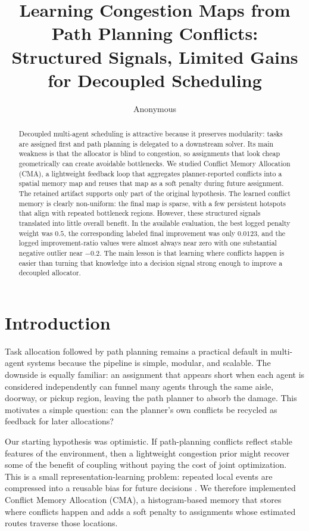 \documentclass{article} %
\title{
Learning Congestion Maps from Path Planning Conflicts:\\
Structured Signals, Limited Gains for Decoupled Scheduling
}
\author{Anonymous}
\begin{document}
\maketitle

\begin{abstract}
Decoupled multi-agent scheduling is attractive because it preserves modularity: tasks are assigned first and path planning is delegated to a downstream solver. Its main weakness is that the allocator is blind to congestion, so assignments that look cheap geometrically can create avoidable bottlenecks. We studied Conflict Memory Allocation (CMA), a lightweight feedback loop that aggregates planner-reported conflicts into a spatial memory map and reuses that map as a soft penalty during future assignment. The retained artifact supports only part of the original hypothesis. The learned conflict memory is clearly non-uniform: the final map is sparse, with a few persistent hotspots that align with repeated bottleneck regions. However, these structured signals translated into little overall benefit. In the available evaluation, the best logged penalty weight was $0.5$, the corresponding labeled final improvement was only $0.0123$, and the logged improvement-ratio values were almost always near zero with one substantial negative outlier near $-0.2$. The main lesson is that learning where conflicts happen is easier than turning that knowledge into a decision signal strong enough to improve a decoupled allocator.
\end{abstract}

\section{Introduction}
\label{sec:intro}

Task allocation followed by path planning remains a practical default in multi-agent systems because the pipeline is simple, modular, and scalable. The downside is equally familiar: an assignment that appears short when each agent is considered independently can funnel many agents through the same aisle, doorway, or pickup region, leaving the path planner to absorb the damage. This motivates a simple question: can the planner's own conflicts be recycled as feedback for later allocations?

Our starting hypothesis was optimistic. If path-planning conflicts reflect stable features of the environment, then a lightweight congestion prior might recover some of the benefit of coupling without paying the cost of joint optimization. This is a small representation-learning problem: repeated local events are compressed into a reusable bias for future decisions \citep{goodfellow2016deep}. We therefore implemented Conflict Memory Allocation (CMA), a histogram-based memory that stores where conflicts happen and adds a soft penalty to assignments whose estimated routes traverse those locations.
\end{document}

